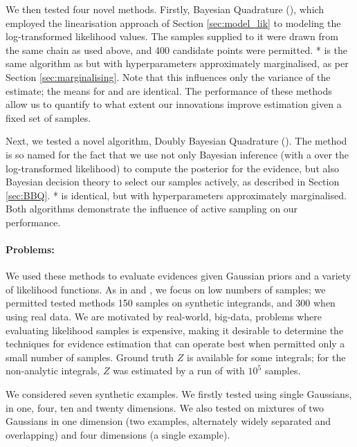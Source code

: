 \documentclass{article} %
\begin{document}
We then tested four novel methods. Firstly, Bayesian Quadrature (), which employed the linearisation approach of Section \ref{sec:model_lik} to modeling the log-transformed likelihood values. The samples supplied to it were drawn from the same  chain as used above, and 400 candidate points were permitted. * is the same algorithm as  but with hyperparameters approximately marginalised, as per Section \ref{sec:marginalising}. Note that this influences only the variance of the estimate; the means for  and  are identical. The performance of these methods allow us to quantify to what extent our innovations improve estimation given a fixed set of samples. 

Next, we tested a novel algorithm, Doubly Bayesian Quadrature (). The method is so named for the fact that we use not only Bayesian inference (with a \gpb over the log-transformed likelihood) to compute the posterior for the evidence, but also Bayesian decision theory to select our samples actively, as described in Section \ref{sec:BBQ}. %
* is identical, but with hyperparameters approximately marginalised. Both algorithms demonstrate the influence of active sampling on our performance. 

\paragraph{Problems:}
We used these methods to evaluate evidences given Gaussian priors and a variety of likelihood functions. As in \cite{BZMonteCarlo} and \cite{BQR}, we focus on low numbers of samples; we permitted tested methods 150 samples on synthetic integrands, and 300 when using real data. We are motivated by real-world, big-data, problems where evaluating likelihood samples is expensive, making it desirable to determine the techniques for evidence estimation that can operate best when permitted only a small number of samples. Ground truth $Z$ is available for some integrals; for the non-analytic integrals, $Z$ was estimated by a run of  with $10^5$ samples.

We considered seven synthetic examples. We firstly tested using single Gaussians, in one, four, ten and twenty dimensions. We also tested on mixtures of two Gaussians in one dimension (two examples, alternately widely separated and overlapping) and four dimensions (a single example). %
\end{document}
